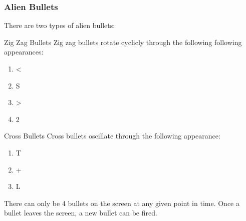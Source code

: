 \documentclass[11pt,letter,oneside]{report}
\begin{document}
\subsubsection{Alien Bullets}
There are two types of alien bullets:
\begin{description}
\item{Zig Zag Bullets}  Zig zag bullets rotate cyclicly through the following following appearances:

\begin{enumerate}
\item <
\item S
\item >
\item 2
\end{enumerate}

\item{Cross Bullets}  Cross bullets oscillate through the following appearance:

\begin{enumerate}
\item T
\item +
\item L
\end{enumerate}

\end{description}

There can only be 4 bullets on the screen at any given point in time.  Once a bullet leaves the screen, a new bullet can be fired.
\end{document}
